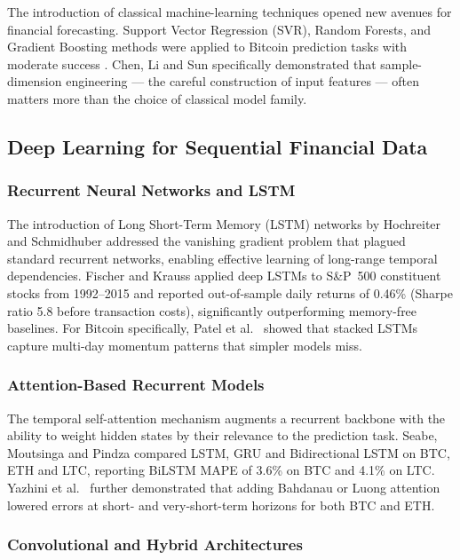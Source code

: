 \documentclass[12pt]{article}
\begin{document}
The introduction of classical machine-learning techniques opened new avenues for financial forecasting. Support Vector Regression (SVR), Random Forests, and Gradient Boosting methods were applied to Bitcoin prediction tasks with moderate success \cite{madan2015,chen2020}. Chen, Li and Sun \cite{chen2020} specifically demonstrated that sample-dimension engineering --- the careful construction of input features --- often matters more than the choice of classical model family.

\subsection{Deep Learning for Sequential Financial Data}

\subsubsection{Recurrent Neural Networks and LSTM}

The introduction of Long Short-Term Memory (LSTM) networks by Hochreiter and Schmidhuber \cite{hochreiter1997} addressed the vanishing gradient problem that plagued standard recurrent networks, enabling effective learning of long-range temporal dependencies. Fischer and Krauss \cite{fischer2018} applied deep LSTMs to S\&P~500 constituent stocks from 1992--2015 and reported out-of-sample daily returns of 0.46\% (Sharpe ratio 5.8 before transaction costs), significantly outperforming memory-free baselines. For Bitcoin specifically, Patel et al.\ \cite{patel2020} showed that stacked LSTMs capture multi-day momentum patterns that simpler models miss.

\subsubsection{Attention-Based Recurrent Models}

The temporal self-attention mechanism augments a recurrent backbone with the ability to weight hidden states by their relevance to the prediction task. Seabe, Moutsinga and Pindza \cite{seabe2023} compared LSTM, GRU and Bidirectional LSTM on BTC, ETH and LTC, reporting BiLSTM MAPE of 3.6\% on BTC and 4.1\% on LTC. Yazhini et al.\ \cite{yazhini2023} further demonstrated that adding Bahdanau or Luong attention lowered errors at short- and very-short-term horizons for both BTC and ETH.

\subsubsection{Convolutional and Hybrid Architectures}
\end{document}
